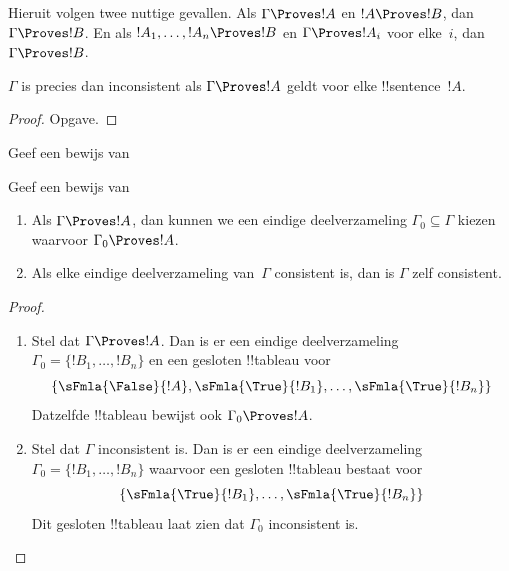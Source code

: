 \documentclass[openany]{memoir}
\begin{document}
Hieruit volgen twee nuttige gevallen. Als $\Gamma \Proves !A$ en $!A
\Proves !B$, dan $\Gamma \Proves !B$. En als $!A_1,
\dots, !A_n \Proves !B$ en $\Gamma \Proves !A_i$ voor elke~$i$, dan
$\Gamma \Proves !B$.

\begin{prop}
$\Gamma$ is precies dan inconsistent als $\Gamma \Proves !A$ geldt
voor elke !!{sentence}~$!A$.
\end{prop}

\begin{proof}
Opgave.
\end{proof}

\begin{prob}
Geef een bewijs van 
\end{prob}
\tagendprob

\begin{prob}
Geef een bewijs van 
\end{prob}
\tagendprob

\begin{prop}
  \begin{enumerate}
  \item Als $\Gamma \Proves !A$, dan kunnen we een eindige
    deelverzameling $\Gamma_0 \subseteq \Gamma$ kiezen waarvoor
    $\Gamma_0 \Proves !A$.
  \item Als elke eindige deelverzameling van~$\Gamma$ consistent is,
    dan is $\Gamma$ zelf consistent.
  \end{enumerate}
\end{prop}

\begin{proof}
  \begin{enumerate}
    \item Stel dat $\Gamma \Proves !A$. Dan is er een eindige
      deelverzameling $\Gamma_0 = \{!B_1, \dots, !B_n\}$ en een
      gesloten !!{tableau} voor
      \[
      \{\sFmla{\False}{!A}, \sFmla{\True}{!B_1}, \dots, \sFmla{\True}{!B_n}\}
      \]
      Datzelfde !!{tableau} bewijst ook $\Gamma_0 \Proves !A$.
    \item Stel dat $\Gamma$ inconsistent is. Dan is er een eindige
      deelverzameling $\Gamma_0 = \{!B_1, \dots, !B_n\}$ waarvoor een
      gesloten !!{tableau} bestaat voor
      \[
      \{\sFmla{\True}{!B_1}, \dots, \sFmla{\True}{!B_n}\}
      \]
      Dit gesloten !!{tableau} laat zien dat $\Gamma_0$ inconsistent
      is.
  \end{enumerate}
\end{proof}
\endgroup
\end{document}
